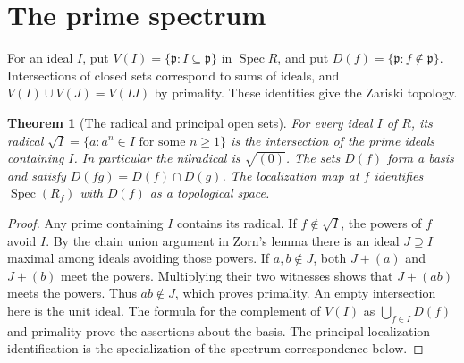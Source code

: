 \documentclass[11pt,oneside,openany]{book}
\newtheorem{theorem}{Theorem}[chapter]
\theoremstyle{definition}
\theoremstyle{remark}
\begin{document}
\section{The prime spectrum}

For an ideal \(I\), put \(V(I)=\{\mathfrak p:I\subseteq\mathfrak p\}\) in \(\operatorname{Spec}R\), and put \(D(f)=\{\mathfrak p:f\notin\mathfrak p\}\). Intersections of closed sets correspond to sums of ideals, and \(V(I)\cup V(J)=V(IJ)\) by primality. These identities give the Zariski topology.

\begin{theorem}[The radical and principal open sets]\label{p103:ALG-05-C01-S02}
For every ideal \(I\) of \(R\), its radical \(\sqrt I=\{a:a^n\in I\text{ for some }n\ge1\}\) is the intersection of the prime ideals containing \(I\). In particular the nilradical is \(\sqrt{(0)}\). The sets \(D(f)\) form a basis and satisfy \(D(fg)=D(f)\cap D(g)\). The localization map at \(f\) identifies \(\operatorname{Spec}(R_f)\) with \(D(f)\) as a topological space.
\end{theorem}
\begin{proof}
Any prime containing \(I\) contains its radical. If \(f\notin\sqrt I\), the powers of \(f\) avoid \(I\). By the chain union argument in Zorn's lemma there is an ideal \(J\supseteq I\) maximal among ideals avoiding those powers. If \(a,b\notin J\), both \(J+(a)\) and \(J+(b)\) meet the powers. Multiplying their two witnesses shows that \(J+(ab)\) meets the powers. Thus \(ab\notin J\), which proves primality. An empty intersection here is the unit ideal. The formula for the complement of \(V(I)\) as \(\bigcup_{f\in I}D(f)\) and primality prove the assertions about the basis. The principal localization identification is the specialization of the spectrum correspondence below.
\end{proof}
\end{document}
